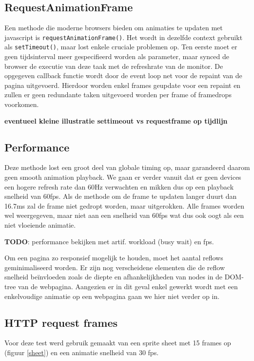 \subsection{RequestAnimationFrame}

Een methode die moderne browsers bieden om animaties te updaten met javascript is \texttt{requestAnimationFrame()}. Het wordt in dezelfde context gebruikt als \texttt{setTimeout()}, maar lost enkele cruciale problemen op. Ten eerste moet er geen tijdsinterval meer gespecifieerd worden als parameter, maar synced de browser de executie van deze taak met de refreshrate van de monitor. De opgegeven callback functie wordt door de event loop net voor de repaint van de pagina uitgevoerd. Hierdoor worden enkel frames geupdate voor een repaint en zullen er geen redundante taken uitgevoerd worden per frame of framedrops voorkomen. \cite{requestFrameDocs}

\textbf{eventueel kleine illustratie settimeout vs requestframe op tijdlijn}

\subsection{Performance} \label{performance}
Deze methode lost een groot deel van globale timing op, maar garandeerd daarom geen smooth animation playback. We gaan er verder vanuit dat er geen devices een hogere refresh rate dan 60Hz verwachten en mikken dus op een playback snelheid van 60fps. Als de methode om de frame te updaten langer duurt dan 16.7ms zal de frame niet gedropt worden, maar uitgerokken. Alle frames worden wel weergegeven, maar niet aan een snelheid van 60fps wat dus ook oogt als een niet vloeiende animatie.

\textbf{TODO}: performance bekijken met artif. workload (busy wait) en fps.

Om een pagina zo responsief mogelijk te houden, moet het aantal reflows geminimaliseerd worden. Er zijn nog verscheidene elementen die de reflow snelheid beïnvloeden zoals de diepte en afhankelijkheden van nodes in de DOM-tree van de webpagina. Aangezien er in dit geval enkel gewerkt wordt met een enkelvoudige animatie op een webpagina gaan we hier niet verder op in.
\cite{improvePerformance}


\subsection{HTTP request frames}

Voor deze test werd gebruik gemaakt van een sprite sheet met 15 frames op (figuur \ref{sheet}) en een animatie snelheid van 30 fps.


